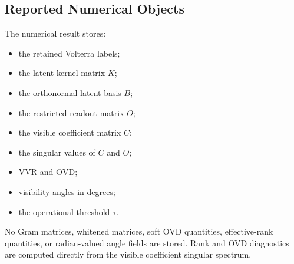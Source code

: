 \documentclass[11pt]{article}
\begin{document}
\subsection{Reported Numerical Objects}

The numerical result stores:
\begin{itemize}[leftmargin=*]
    \item the retained Volterra labels;
    \item the latent kernel matrix $K$;
    \item the orthonormal latent basis $B$;
    \item the restricted readout matrix $O$;
    \item the visible coefficient matrix $C$;
    \item the singular values of $C$ and $O$;
    \item $\mathrm{VVR}$ and $\mathrm{OVD}$;
    \item visibility angles in degrees;
    \item the operational threshold $\tau$.
\end{itemize}
No Gram matrices, whitened matrices, soft OVD quantities, effective-rank
quantities, or radian-valued angle fields are stored.  Rank and OVD diagnostics
are computed directly from the visible coefficient singular spectrum.
\end{document}
